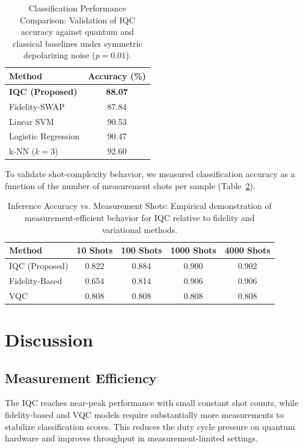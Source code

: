 \documentclass[conference]{IEEEtran}
\begin{document}
\begin{table}[ht]
\centering
\caption{Classification Performance Comparison: Validation of IQC accuracy against quantum and classical baselines under symmetric depolarizing noise ($p=0.01$).}
\label{tab:metrics}
\begin{tabular}{l c}
\toprule
Method & Accuracy (\%) \\
\midrule
\textbf{IQC (Proposed)} & \textbf{88.07} \\
Fidelity-SWAP & 87.84 \\
Linear SVM & 90.53 \\
Logistic Regression & 90.47 \\
k-NN ($k=3$) & 92.60 \\
\bottomrule
\end{tabular}
\end{table}

To validate shot-complexity behavior, we measured classification accuracy as a function of the number of measurement shots per sample (Table~\ref{tab:shots}).

\begin{table}[ht]
\centering
\caption{Inference Accuracy vs. Measurement Shots: Empirical demonstration of measurement-efficient behavior for IQC relative to fidelity and variational methods.}
\label{tab:shots}
\begin{tabular}{l c c c c}
\toprule
Method & 10 Shots & 100 Shots & 1000 Shots & 4000 Shots \\
\midrule
IQC (Proposed) & 0.822 & 0.884 & 0.900 & 0.902 \\
Fidelity-Based & 0.654 & 0.814 & 0.906 & 0.906 \\
VQC & 0.808 & 0.808 & 0.808 & 0.808 \\
\bottomrule
\end{tabular}
\end{table}

\section{Discussion}

\subsection{Measurement Efficiency}
The IQC reaches near-peak performance with small constant shot counts, while fidelity-based and VQC models require substantially more measurements to stabilize classification scores. This reduces the duty cycle pressure on quantum hardware and improves throughput in measurement-limited settings.
\end{document}

